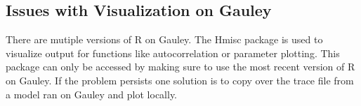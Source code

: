 \documentclass{article}
\begin{document}
\subsection{Issues with Visualization on Gauley}
There are mutiple versions of R on Gauley. The Hmisc package is used to visualize output for functions like autocorrelation or parameter plotting. This package can only be accessed by making sure to use the most recent version of R on Gauley. If the problem persists one solution is to copy over the trace file from a model ran on Gauley and plot locally.
\end{document}
